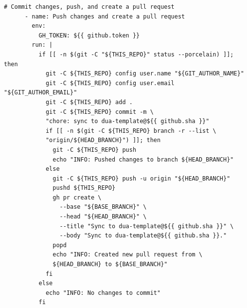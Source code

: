 \begin{center}
\begin{lstlisting}[caption={\texttt{dua-template} update GitHub workflow as of November 22, 2024 \cite{masocco_dua-template_nodate}.}, label={lst:duawf}]
      # Commit changes, push, and create a pull request
      - name: Push changes and create a pull request
        env:
          GH_TOKEN: ${{ github.token }}
        run: |
          if [[ -n $(git -C "${THIS_REPO}" status --porcelain) ]]; then
            git -C ${THIS_REPO} config user.name "${GIT_AUTHOR_NAME}"
            git -C ${THIS_REPO} config user.email "${GIT_AUTHOR_EMAIL}"
            git -C ${THIS_REPO} add .
            git -C ${THIS_REPO} commit -m \
            "chore: sync to dua-template@${{ github.sha }}"
            if [[ -n $(git -C ${THIS_REPO} branch -r --list \
            "origin/${HEAD_BRANCH}") ]]; then
              git -C ${THIS_REPO} push
              echo "INFO: Pushed changes to branch ${HEAD_BRANCH}"
            else
              git -C ${THIS_REPO} push -u origin "${HEAD_BRANCH}"
              pushd ${THIS_REPO}
              gh pr create \
                --base "${BASE_BRANCH}" \
                --head "${HEAD_BRANCH}" \
                --title "Sync to dua-template@${{ github.sha }}" \
                --body "Sync to dua-template@${{ github.sha }}."
              popd
              echo "INFO: Created new pull request from \
              ${HEAD_BRANCH} to ${BASE_BRANCH}"
            fi
          else
            echo "INFO: No changes to commit"
          fi
\end{lstlisting}
\end{center}
